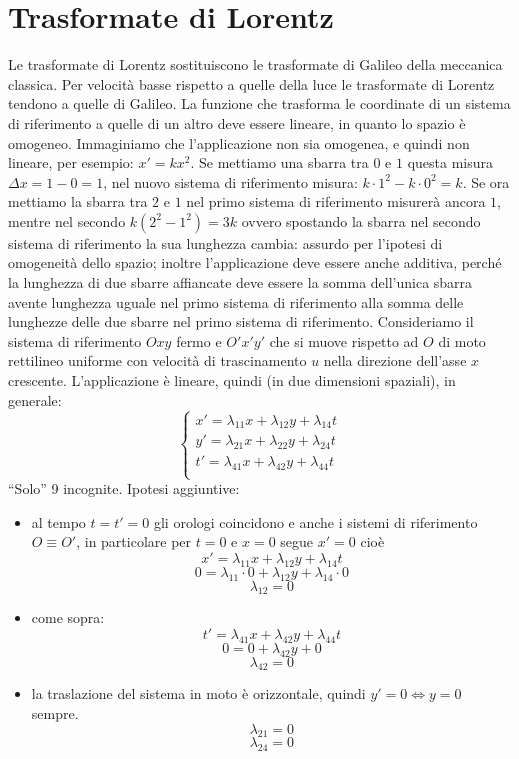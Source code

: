 \section{Trasformate di Lorentz}
Le trasformate di Lorentz sostituiscono le trasformate di Galileo della meccanica classica. Per velocità basse rispetto a quelle della luce le trasformate di Lorentz tendono a quelle di Galileo.
La funzione che trasforma le coordinate di un sistema di riferimento a quelle di un altro deve essere lineare, in quanto lo spazio è omogeneo. Immaginiamo che l'applicazione non sia omogenea, e quindi non lineare, per esempio: $x'=kx^2$. Se mettiamo una sbarra tra $0$ e $1$ questa misura $\Delta x=1-0=1$, nel nuovo sistema di riferimento misura: $k\cdot 1^2-k\cdot 0^2=k$. Se ora mettiamo la sbarra tra $2$ e $1$ nel primo sistema di riferimento misurerà ancora $1$, mentre nel secondo $k(2^2-1^2)=3k$ ovvero spostando la sbarra nel secondo sistema di riferimento la sua lunghezza cambia: assurdo per l'ipotesi di omogeneità dello spazio; inoltre l'applicazione deve essere anche additiva, perché la lunghezza di due sbarre affiancate deve essere la somma dell'unica sbarra avente lunghezza uguale nel primo sistema di riferimento alla somma delle lunghezze delle due sbarre nel primo sistema di riferimento. Consideriamo il sistema di riferimento $Oxy$ fermo e $O'x'y'$ che si muove rispetto ad $O$ di moto rettilineo uniforme con velocità di trascinamento $u$ nella direzione dell'asse $x$ crescente. L'applicazione è lineare, quindi (in due dimensioni spaziali), in generale:
\[\left\{
   \begin{array}{l}
      x'=\lambda_{11}x+\lambda_{12}y+\lambda_{14}t \\
      y'=\lambda_{21}x+\lambda_{22}y+\lambda_{24}t \\
      t'=\lambda_{41}x+\lambda_{42}y+\lambda_{44}t \\\end{array}\right.
\]
``Solo'' 9 incognite. Ipotesi aggiuntive:
\begin{itemize}
   \item[-] al tempo $t=t'=0$ gli orologi coincidono e anche i sistemi di riferimento $O\equiv O'$, in particolare per $t=0$ e $x=0$ segue $x'=0$ cioè
      \[x'=\lambda_{11}x+\lambda_{12}y+\lambda_{14}t\]
      \[0=\lambda_{11}\cdot 0+\lambda_{12}y+\lambda_{14}\cdot 0\]
      \[\lambda_{12}=0\]
   \item[-] come sopra:
      \[t'=\lambda_{41}x+\lambda_{42}y+\lambda_{44}t\]
      \[0=0+\lambda_{42}y+0\]
      \[\lambda_{42}=0\]
   \item[-] la traslazione del sistema in moto è orizzontale, quindi $y'=0\Leftrightarrow y=0$ sempre.
      \[\lambda_{21}=0\]
      \[\lambda_{24}=0\]

\end{itemize}


